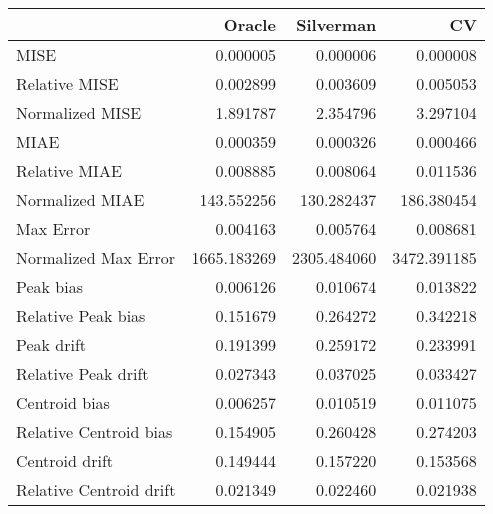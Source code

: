 \begin{tabular}{lrrr}
  \hline
 & Oracle & Silverman & CV \\ 
  \hline
MISE & 0.000005 & 0.000006 & 0.000008 \\ 
  Relative MISE & 0.002899 & 0.003609 & 0.005053 \\ 
  Normalized MISE & 1.891787 & 2.354796 & 3.297104 \\ 
  MIAE & 0.000359 & 0.000326 & 0.000466 \\ 
  Relative MIAE & 0.008885 & 0.008064 & 0.011536 \\ 
  Normalized MIAE & 143.552256 & 130.282437 & 186.380454 \\ 
  Max Error & 0.004163 & 0.005764 & 0.008681 \\ 
  Normalized Max Error & 1665.183269 & 2305.484060 & 3472.391185 \\ 
  Peak bias & 0.006126 & 0.010674 & 0.013822 \\ 
  Relative Peak bias & 0.151679 & 0.264272 & 0.342218 \\ 
  Peak drift & 0.191399 & 0.259172 & 0.233991 \\ 
  Relative Peak drift & 0.027343 & 0.037025 & 0.033427 \\ 
  Centroid bias & 0.006257 & 0.010519 & 0.011075 \\ 
  Relative Centroid bias & 0.154905 & 0.260428 & 0.274203 \\ 
  Centroid drift & 0.149444 & 0.157220 & 0.153568 \\ 
  Relative Centroid drift & 0.021349 & 0.022460 & 0.021938 \\ 
   \hline
\end{tabular}
